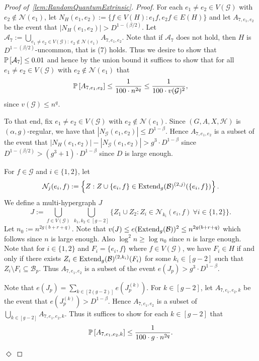\documentclass[11pt]{article}
\newcommand{\mc}[1]{\mathcal{#1}}
\newcounter{i}
\theoremstyle{plain}
\newenvironment{proofclaim}[1][]%
{\noindent \emph{Proof.} {}{#1}{}}{\hfill
	$\Diamond$\vspace{1em}}
\renewcommand{\theclaim}{\thetheorem.\arabic{claim}}
\newenvironment{lateproof}[1]
 {%
  \renewcommand{\theclaim}{\ref{#1}.\arabic{claim}}%
  \begin{proof}[Proof of~\cref{#1}]%
 }
 {\end{proof}}
\theoremstyle{plain} %
\theoremstyle{definition}
\newcommand{\Prob}[1]{\ensuremath{%
\mathbb P\left[#1\right]
}}
\begin{document}
\begin{lateproof}{lem:RandomQuantumExtrinsic}
\begin{proofclaim}
For each $e_1\ne e_2\in V(\mc{G})$ with $e_2\not\in \mc{N}(e_1)$, let $N_{H}(e_1,e_2):= \{ f\in V(H): e_1f, e_2f\in E(H)\}$ and let $A_{7,e_1,e_2}$ be the event that $|N_H(e_1,e_2)| > D^{1-(\beta/2)}$.
Let $\mathcal{A}_7 := \bigcup_{e_1\ne e_2\in V(\mc{G}):~e_2\not\in \mc{N}(e_1)} A_{7,e_1,e_2}$. Note that if $\mc{A}_7$ does not hold, then $H$ is $D^{1-(\beta/2)}$-uncommon, that is (7) holds. Thus we desire to show that $\Prob{\mc{A}_7} \le 0.01$ and hence by the union bound it suffices to show that for all $e_1\ne e_2\in V(\mc{G})$ with $e_2\not\in \mc{N}(e_1)$ that
$$\Prob{A_{7,e_1,e_2}} \le \frac{1}{100\cdot n^{2q}} \le \frac{1}{100 \cdot v(\mc{G})^2},$$
since $v(\mc{G})\le n^q$.

To that end, fix $e_1\ne e_2\in V(\mc{G})$ with $e_2\not\in \mc{N}(e_1)$. Since $(G,A,X,\mc{H})$ is $(\alpha,g)$-regular, we have that  $|N_{\mc{G}}(e_1,e_2)| \le D^{1-\beta}$. Hence $A_{7,e_1,e_2}$ is a subset of the event that $|N_{H}(e_1,e_2)| - |N_{\mc{G}}(e_1,e_2)| > g^3\cdot D^{1-\beta}$ since $D^{1-(\beta/2)} > (g^3+1)\cdot D^{1-\beta}$ since $D$ is large enough. 


For $f\in \mc{G}$ and $i\in \{1,2\}$, let 
$$\mc{N}_{j}(e_i,f) := \left\{Z: Z\cup\{e_i,f\}\in{\rm Extend}_g(\mc{B})^{(2,j)}(\{e_i,f\})\right\}.$$
We define a multi-hypergraph $J$ 
$$J:= \bigcup_{f\in V(\mc{G})}~\bigcup_{k_1, k_2\in [g-2]} \bigg\{ Z_1\cup Z_2: Z_i\in \mc{N}_{k_i}(e_i,f)~\forall i\in\{1,2\} \bigg\}.$$
Let $n_0:= n^{2g(b+r+q)}$. Note that $v(J) \le e({\rm Extend}_g(\mc{B}))^2 \le n^{2g(b+r+q)}$ which follows since $n$ is large enough. Also $\log^2 n\ge \log n_0$ since $n$ is large enough. Note that for $i\in \{1,2\}$ and $F_i=\{e_i,f\}$ where $f\in V(\mc{G})$, we have $F_i\in H$ if and only if there exists $Z_i\in{\rm Extend}_g(\mc{B})^{(2,k_i)}(F_i)$ for some $k_i\in [g-2]$ such that $Z_i\setminus F_i\subseteq \mc{B}_p$. Thus $A_{7,e_1,e_2}$ is a subset of the event $e(J_p) > g^3\cdot D^{1-\beta}$.

Note that $e(J_p) = \sum_{k\in [2(g-2)]} e\left(J^{(k)}_p\right)$. For $k\in [g-2]$, let $A_{7,e_1,e_2,k}$ be the event that $e\left(J^{(k)}_p\right) > D^{1-\beta}$. Hence $A_{7,e_1,e_2}$ is a subset of $\bigcup_{k \in [g-2]} A_{7,e_1,e_2,k}$. Thus it suffices to show for each  $k\in [g-2]$ that
$$\Prob{A_{7,e_1,e_2,k}} \le \frac{1}{100\cdot g \cdot n^{2q}}.$$


\end{proofclaim}
\end{lateproof}
\end{document}
